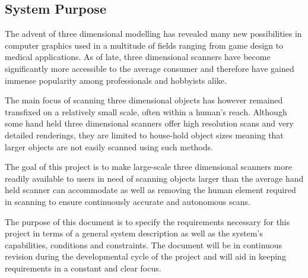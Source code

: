 \documentclass[10pt,letterpaper]{article}
\begin{document}
\subsection{System Purpose}
The advent of three dimensional modelling has revealed many new possibilities in computer graphics used in a multitude of fields ranging from game design to medical applications. As of late, three dimensional scanners have become significantly more accessible to the average consumer and therefore have gained immense popularity among professionals and hobbyists alike. \par 
The main focus of scanning three dimensional objects has however remained transfixed on a relatively small scale, often within a human's reach. Although some hand held three dimensional scanners offer high resolution scans and very detailed renderings, they are limited to house-hold object sizes meaning that larger objects are not easily scanned using such methods. \par 
The goal of this project is to make large-scale three dimensional scanners more readily available to users in need of scanning objects larger than the average hand held scanner can accommodate as well as removing the human element required in scanning to ensure continuously accurate and autonomous scans. \par 
The purpose of this document is to specify the requirements necessary for this project in terms of a general system description as well as the system's capabilities, conditions and constraints. The document will be in continuous revision during the developmental cycle of the project and will aid in keeping requirements in a constant and clear focus.
\end{document}

